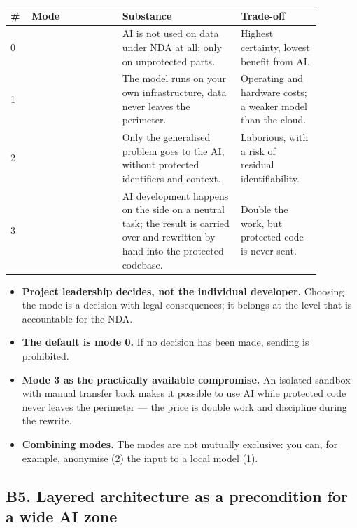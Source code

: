 \medskip
\noindent
\begin{tabularx}{\linewidth}{L{0.05\linewidth} L{0.26\linewidth} L{0.34\linewidth} L{0.23\linewidth}}
\toprule
{}
{\color{white}\textbf{\#}} & {\color{white}\textbf{Mode}} & {\color{white}\textbf{Substance}} & {\color{white}\textbf{Trade-off}} \\
 &  & AI is not used on data under NDA at all; only on unprotected parts. & Highest certainty, lowest benefit from AI. \\
1 &  & The model runs on your own infrastructure, data never leaves the perimeter. & Operating and hardware costs; a weaker model than the cloud. \\
2 &  & Only the generalised problem goes to the AI, without protected identifiers and context. & Laborious, with a risk of residual identifiability. \\
3 &  & AI development happens on the side on a neutral task; the result is carried over and rewritten by hand into the protected codebase. & Double the work, but protected code is never sent. \\
\bottomrule
\end{tabularx}

\medskip
\begin{itemize}
\item \textbf{Project leadership decides, not the individual developer.}
Choosing the mode is a decision with legal consequences; it belongs at the level that is accountable for the NDA.
\item \textbf{The default is mode 0.}
If no decision has been made, sending is prohibited.
\item \textbf{Mode 3 as the practically available compromise.}
An isolated sandbox with manual transfer back makes it possible to use AI while protected code never leaves the perimeter --- the price is double work and discipline during the rewrite.
\item \textbf{Combining modes.}
The modes are not mutually exclusive: you can, for example, anonymise (2) the input to a local model (1).
\end{itemize}

\subsection{B5. Layered architecture as a precondition for a wide AI zone}

